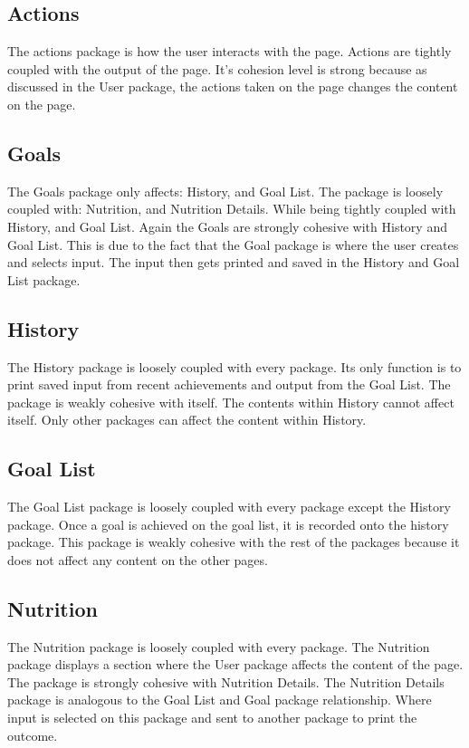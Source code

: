 \documentclass[a4paper]{article}
\begin{document}
\subsection{Actions}
The actions package is how the user interacts with the page. Actions are tightly coupled with the output of the page. It's cohesion level is strong because as discussed in the User package, the actions taken on the page changes the content on the page.

\subsection{Goals}
The Goals package only affects: History, and Goal List. The package is loosely coupled with: Nutrition, and Nutrition Details. While being tightly coupled with History, and Goal List. Again the Goals are strongly cohesive with History and Goal List. This is due to the fact that the Goal package is where the user creates and selects input. The input then gets printed and saved in the History and Goal List package.

\subsection{History}
The History package is loosely coupled with every package. Its only function is to print saved input from recent achievements and output from the Goal List. The package is weakly cohesive with itself. The contents within History cannot affect itself. Only other packages can affect the content within History.

\subsection{Goal List}
The Goal List package is loosely coupled with every package except the History package. Once a goal is achieved on the goal list, it is recorded onto the history package. This package is weakly cohesive with the rest of the packages because it does not affect any content on the other pages.

\subsection{Nutrition}
The Nutrition package is loosely coupled with every package. The Nutrition package displays a section where the User package affects the content of the page. The package is strongly cohesive with Nutrition Details. The Nutrition Details package is analogous to the Goal List and Goal package relationship. Where input is selected on this package and sent to another package to print the outcome.
\end{document}
